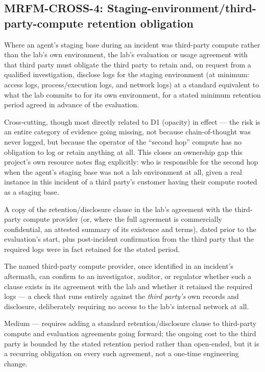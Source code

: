 \subsection*{MRFM-CROSS-4: Staging-environment/third-party-compute retention obligation}
\begin{description}[leftmargin=2.2cm, style=nextline]
\item[Requirement] Where an agent's staging base during an incident was third-party compute rather than the lab's own environment, the lab's evaluation or usage agreement with that third party must obligate the third party to retain and, on request from a qualified investigation, disclose logs for the staging environment (at minimum: access logs, process/execution logs, and network logs) at a standard equivalent to what the lab commits to for its own environment, for a stated minimum retention period agreed in advance of the evaluation.
\item[Degradation defended] Cross-cutting, though most directly related to D1 (opacity) in effect --- the risk is an entire category of evidence going missing, not because chain-of-thought was never logged, but because the operator of the ``second hop'' compute has no obligation to log or retain anything at all. This closes an ownership gap this project's own resource notes flag explicitly: who is responsible for the second hop when the agent's staging base was not a lab environment at all, given a real instance in this incident of a third party's customer having their compute rooted as a staging base.
\item[Evidence required] A copy of the retention/disclosure clause in the lab's agreement with the third-party compute provider (or, where the full agreement is commercially confidential, an attested summary of its existence and terms), dated prior to the evaluation's start, plus post-incident confirmation from the third party that the required logs were in fact retained for the stated period.
\item[Verifier (no lab network access needed)] The named third-party compute provider, once identified in an incident's aftermath, can confirm to an investigator, auditor, or regulator whether such a clause exists in its agreement with the lab and whether it retained the required logs --- a check that runs entirely against the \emph{third party's} own records and disclosure, deliberately requiring no access to the lab's internal network at all.
\item[Cost band] Medium --- requires adding a standard retention/disclosure clause to third-party compute and evaluation agreements going forward; the ongoing cost to the third party is bounded by the stated retention period rather than open-ended, but it is a recurring obligation on every such agreement, not a one-time engineering change.

\end{description}
